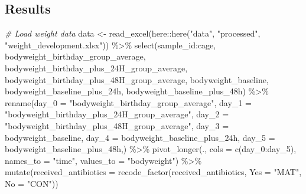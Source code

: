 \documentclass[
]{article}
\newenvironment{Shaded}{\begin{snugshade}}{\end{snugshade}}
\newcommand{\AttributeTok}[1]{\textcolor[rgb]{0.77,0.63,0.00}{#1}}
\newcommand{\CommentTok}[1]{\textcolor[rgb]{0.56,0.35,0.01}{\textit{#1}}}
\newcommand{\FunctionTok}[1]{\textcolor[rgb]{0.00,0.00,0.00}{#1}}
\newcommand{\NormalTok}[1]{#1}
\newcommand{\OtherTok}[1]{\textcolor[rgb]{0.56,0.35,0.01}{#1}}
\newcommand{\SpecialCharTok}[1]{\textcolor[rgb]{0.00,0.00,0.00}{#1}}
\newcommand{\StringTok}[1]{\textcolor[rgb]{0.31,0.60,0.02}{#1}}
\begin{document}
\hypertarget{results}{%
\subsection{Results}\label{results}}

\begin{Shaded}
\begin{Highlighting}[]
\CommentTok{\# Load weight data}
\NormalTok{data }\OtherTok{\textless{}{-}} \FunctionTok{read\_excel}\NormalTok{(here}\SpecialCharTok{::}\FunctionTok{here}\NormalTok{(}\StringTok{"data"}\NormalTok{, }\StringTok{"processed"}\NormalTok{, }\StringTok{"weight\_development.xlsx"}\NormalTok{)) }\SpecialCharTok{\%\textgreater{}\%} 
  \FunctionTok{select}\NormalTok{(sample\_id}\SpecialCharTok{:}\NormalTok{cage, bodyweight\_birthday\_group\_average, bodyweight\_birthday\_plus\_24H\_group\_average, bodyweight\_birthday\_plus\_48H\_group\_average, bodyweight\_baseline, bodyweight\_baseline\_plus\_24h, bodyweight\_baseline\_plus\_48h) }\SpecialCharTok{\%\textgreater{}\%} 
  \FunctionTok{rename}\NormalTok{(}\AttributeTok{day\_0 =} \StringTok{"bodyweight\_birthday\_group\_average"}\NormalTok{,}
         \AttributeTok{day\_1 =} \StringTok{"bodyweight\_birthday\_plus\_24H\_group\_average"}\NormalTok{, }
         \AttributeTok{day\_2 =} \StringTok{"bodyweight\_birthday\_plus\_48H\_group\_average"}\NormalTok{,}
         \AttributeTok{day\_3 =}\NormalTok{ bodyweight\_baseline, }
         \AttributeTok{day\_4 =} \StringTok{\textasciigrave{}}\AttributeTok{bodyweight\_baseline\_plus\_24h}\StringTok{\textasciigrave{}}\NormalTok{, }
         \AttributeTok{day\_5 =} \StringTok{\textasciigrave{}}\AttributeTok{bodyweight\_baseline\_plus\_48h}\StringTok{\textasciigrave{}}\NormalTok{,) }\SpecialCharTok{\%\textgreater{}\%} 
  \FunctionTok{pivot\_longer}\NormalTok{(., }\AttributeTok{cols =} \FunctionTok{c}\NormalTok{(day\_0}\SpecialCharTok{:}\NormalTok{day\_5),}
                \AttributeTok{names\_to =} \StringTok{"time"}\NormalTok{,}
                \AttributeTok{values\_to =} \StringTok{"bodyweight"}\NormalTok{) }\SpecialCharTok{\%\textgreater{}\%} 
  \FunctionTok{mutate}\NormalTok{(}\AttributeTok{received\_antibiotics =} \FunctionTok{recode\_factor}\NormalTok{(received\_antibiotics, }
                                       \AttributeTok{Yes =} \StringTok{"MAT"}\NormalTok{,}
                                       \AttributeTok{No =} \StringTok{"CON"}\NormalTok{))}
\end{Highlighting}
\end{Shaded}
\end{document}
